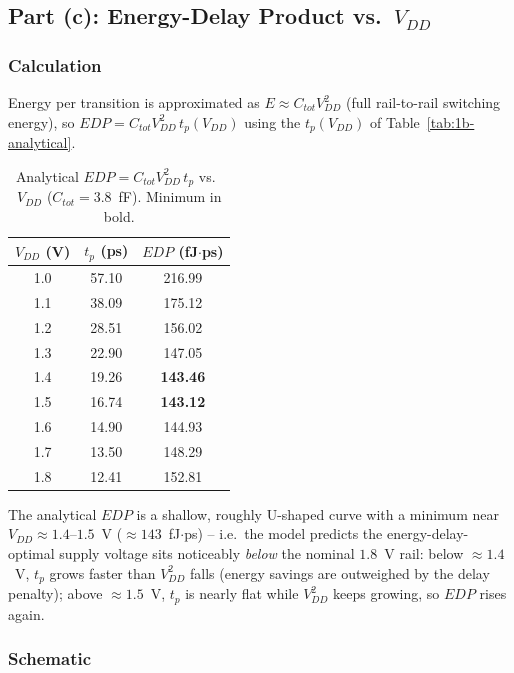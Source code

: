 \subsection{Part (c): Energy-Delay Product vs.\ $V_{DD}$}

\subsubsection{Calculation}

Energy per transition is approximated as $E\approx C_{tot}V_{DD}^2$ (full
rail-to-rail switching energy), so $EDP = C_{tot}V_{DD}^2\,t_p(V_{DD})$ using
the $t_p(V_{DD})$ of Table~\ref{tab:1b-analytical}.

\begin{table}[h]
  \centering
  \begin{tabular}{|c|c|c|}
    \hline
    $V_{DD}$ (V) & $t_p$ (ps) & $EDP$ (fJ$\cdot$ps) \\
    \hline
    1.0 & 57.10 & 216.99 \\
    1.1 & 38.09 & 175.12 \\
    1.2 & 28.51 & 156.02 \\
    1.3 & 22.90 & 147.05 \\
    1.4 & 19.26 & \textbf{143.46} \\
    1.5 & 16.74 & \textbf{143.12} \\
    1.6 & 14.90 & 144.93 \\
    1.7 & 13.50 & 148.29 \\
    1.8 & 12.41 & 152.81 \\
    \hline
  \end{tabular}
  \caption{Analytical $EDP=C_{tot}V_{DD}^2\,t_p$ vs.\ $V_{DD}$
  ($C_{tot}=3.8$~fF). Minimum in bold.}
  \label{tab:1c-analytical}
\end{table}

The analytical $EDP$ is a shallow, roughly U-shaped curve with a minimum near
$V_{DD}\approx1.4$--$1.5$~V ($\approx143$~fJ$\cdot$ps) -- i.e.\ the model
predicts the energy-delay-optimal supply voltage sits noticeably \emph{below}
the nominal $1.8$~V rail: below $\approx1.4$~V, $t_p$ grows faster than
$V_{DD}^2$ falls (energy savings are outweighed by the delay penalty);
above $\approx1.5$~V, $t_p$ is nearly flat while $V_{DD}^2$ keeps growing, so
$EDP$ rises again.

\subsubsection{Schematic}

